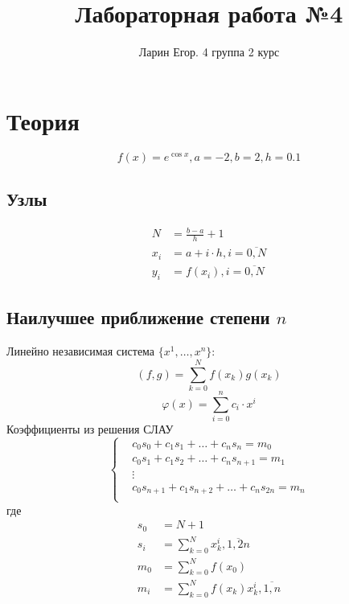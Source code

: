 \documentclass{article}
\title{Лабораторная работа №4}
\author{Ларин Егор. 4 группа 2 курс}
\begin{document}
\maketitle
\section*{Теория}
\begin{equation*}
    f(x) = e ^ {\cos x}, a = -2, b = 2, h = 0.1
\end{equation*}
\subsection*{Узлы}
\begin{equation*}
    \begin{split}
    N &= \frac{b-a}{h} + 1\\
    x_i &= a + i\cdot h, i = \overline{0, N}\\
    y_i &= f(x_i), i = \overline{0, N}
    \end{split}
\end{equation*}
\subsection*{Наилучшее приближение степени $n$}
     Линейно независимая система $\{x^1, \dots, x^n\}$:
     \begin{equation*}
         (f,g) = \sum_{k=0}^N f(x_k)g(x_k)
     \end{equation*}
\begin{equation*}
    \varphi (x) = \sum_{i=0}^n c_i \cdot x^i
\end{equation*}
Коэффициенты из решения СЛАУ
\begin{equation*}
\begin{cases}
    &c_0s_0 + c_1s_1 + \dots + c_ns_n = m_0\\
    &c_0s_1 + c_1s_2 + \dots + c_ns_{n+1} = m_1\\
    &\vdots \\
    &c_0s_{n+1} + c_1s_{n+2} + \dots + c_ns_{2n} = m_n\\
\end{cases}
\end{equation*} где
\begin{equation*}
    \begin{split}
    s_0 &= N+1\\
    s_i &= \sum_{k=0}^N x_k ^ i, \overline{1, 2n}\\
    m_0 &= \sum_{k=0}^N f(x_0)\\
    m_i &= \sum_{k=0}^N f(x_k)x_k ^ i, \overline{1, n}
    \end{split}
\end{equation*}
\end{document}
